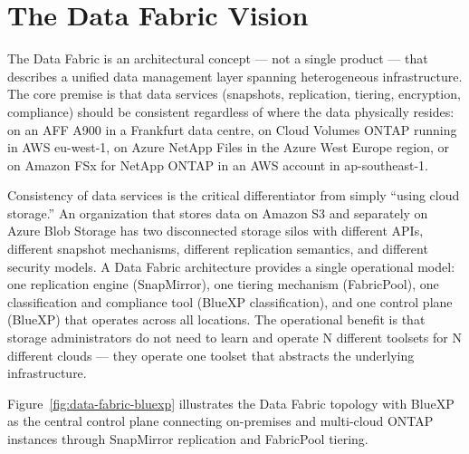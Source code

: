 \section{The Data Fabric Vision}

The Data Fabric is an architectural concept --- not a single product --- that describes a unified data management layer spanning heterogeneous infrastructure. The core premise is that data services (snapshots, replication, tiering, encryption, compliance) should be consistent regardless of where the data physically resides: on an AFF A900 in a Frankfurt data centre, on Cloud Volumes ONTAP running in AWS eu-west-1, on Azure NetApp Files in the Azure West Europe region, or on Amazon FSx for NetApp ONTAP in an AWS account in ap-southeast-1.

Consistency of data services is the critical differentiator from simply ``using cloud storage.'' An organization that stores data on Amazon S3 and separately on Azure Blob Storage has two disconnected storage silos with different APIs, different snapshot mechanisms, different replication semantics, and different security models. A Data Fabric architecture provides a single operational model: one replication engine (SnapMirror), one tiering mechanism (FabricPool), one classification and compliance tool (BlueXP classification), and one control plane (BlueXP) that operates across all locations. The operational benefit is that storage administrators do not need to learn and operate N different toolsets for N different clouds --- they operate one toolset that abstracts the underlying infrastructure.

Figure~\ref{fig:data-fabric-bluexp} illustrates the Data Fabric topology with BlueXP as the central control plane connecting on-premises and multi-cloud ONTAP instances through SnapMirror replication and FabricPool tiering.

